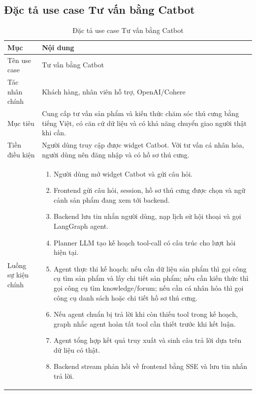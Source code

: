 \documentclass[../DoAn.tex]{subfiles}
\begin{document}
\subsection{Đặc tả use case Tư vấn bằng Catbot}
\label{subsection:2.3.6}

{\normalsize
\setlength{\LTleft}{\fill}
\setlength{\LTright}{\fill}
\setlength{\tabcolsep}{5pt}
\renewcommand{\arraystretch}{1.25}
\begin{longtable}{|p{3.2cm}|p{10.4cm}|}
\caption{Đặc tả use case Tư vấn bằng Catbot}
\label{table:2.9}\\
\hline
\textbf{Mục} & \textbf{Nội dung} \\ \hline
Tên use case & Tư vấn bằng Catbot \\ \hline
Tác nhân chính & Khách hàng, nhân viên hỗ trợ, OpenAI/Cohere \\ \hline
Mục tiêu & Cung cấp tư vấn sản phẩm và kiến thức chăm sóc thú cưng bằng tiếng Việt, có căn cứ dữ liệu và có khả năng chuyển giao người thật khi cần. \\ \hline
Tiền điều kiện & Người dùng truy cập được widget Catbot. Với tư vấn cá nhân hóa, người dùng nên đăng nhập và có hồ sơ thú cưng. \\ \hline
Luồng sự kiện chính &
\begin{minipage}[t]{10.1cm}
\begin{enumerate}[leftmargin=*,topsep=0pt,itemsep=0pt]
    \item Người dùng mở widget Catbot và gửi câu hỏi.
    \item Frontend gửi câu hỏi, session, hồ sơ thú cưng được chọn và ngữ cảnh sản phẩm đang xem tới backend.
    \item Backend lưu tin nhắn người dùng, nạp lịch sử hội thoại và gọi LangGraph agent.
    \item Planner LLM tạo kế hoạch tool-call có cấu trúc cho lượt hỏi hiện tại.
    \item Agent thực thi kế hoạch: nếu cần dữ liệu sản phẩm thì gọi công cụ tìm sản phẩm và lấy chi tiết sản phẩm; nếu cần kiến thức thì gọi công cụ tìm knowledge/forum; nếu cần cá nhân hóa thì gọi công cụ danh sách hoặc chi tiết hồ sơ thú cưng.
    \item Nếu agent chuẩn bị trả lời khi còn thiếu tool trong kế hoạch, graph nhắc agent hoàn tất tool cần thiết trước khi kết luận.
    \item Agent tổng hợp kết quả truy xuất và sinh câu trả lời dựa trên dữ liệu có thật.
    \item Backend stream phản hồi về frontend bằng SSE và lưu tin nhắn trả lời.

\end{enumerate}
\end{minipage}
\end{longtable}}
\end{document}
